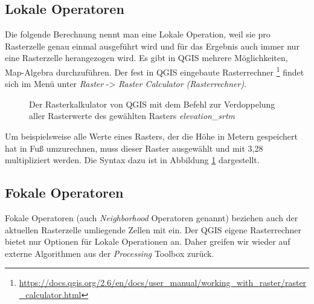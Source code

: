 \documentclass[a4paper,12pt,ngerman]{sphinxmanual}
\begin{document}
\subsection{Lokale Operatoren}
\label{uebung3:lokale-operatoren}
Die folgende Berechnung nennt man eine Lokale Operation, weil sie pro Rasterzelle genau einmal ausgeführt wird und für das Ergebnis auch immer nur eine Rasterzelle herangezogen wird.
Es gibt in QGIS mehrere Möglichkeiten, Map-Algebra durchzuführen. Der fest in QGIS eingebaute Rasterrechner \footnote{
\href{https://docs.qgis.org/2.6/en/docs/user\_manual/working\_with\_raster/raster\_calculator.html}{https://docs.qgis.org/2.6/en/docs/user\_manual/working\_with\_raster/raster\_calculator.html}
} findet sich im Menü unter \emph{Raster} -\textgreater{} \emph{Raster Calculator (Rasterrechner)}.
\begin{figure}[htbp]
\centering
\capstart

\caption{Der Rasterkalkulator von QGIS mit dem Befehl zur Verdoppelung aller Rasterwerte des gewählten Rasters \emph{elevation\_srtm}}\label{uebung3:figqgisrastercalc}\end{figure}

Um beispielsweise alle Werte eines Rasters, der die Höhe in Metern gespeichert hat in Fuß umzurechnen, muss dieser Raster ausgewählt und mit 3,28 multipliziert werden. Die Syntax dazu ist in Abbildung \hyperref[uebung3:figqgisrastercalc]{ \ref*{uebung3:figqgisrastercalc}} dargestellt.


\subsection{Fokale Operatoren}
\label{uebung3:fokale-operatoren}
Fokale Operatoren (auch \emph{Neighborhood} Operatoren genannt) beziehen auch der aktuellen Rasterzelle umliegende Zellen mit ein. Der QGIS eigene Rasterrechner bietet nur Optionen für Lokale Operationen an. Daher greifen wir wieder auf externe Algorithmen aus der \emph{Processing} Toolbox zurück.
\end{document}
